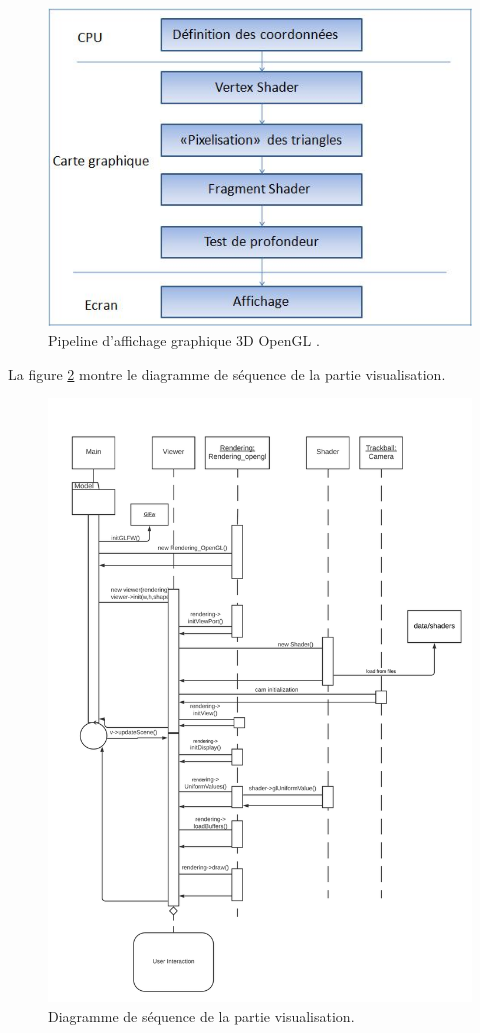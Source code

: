 \documentclass[a4paper]{article}
\begin{document}
\begin{figure}[!ht]
        \begin{center} \includegraphics[width=0.8\linewidth]{img/archi/shader_theory.jpg} \end{center}
        \caption{\label{shader_theory}Pipeline d'affichage graphique 3D OpenGL \protect\footnotemark .}
\end{figure}


La figure \ref{seqvisu} montre le diagramme de séquence de la partie visualisation.

\begin{figure}[!ht]
    \begin{center}
        \includegraphics[width=0.7\linewidth]{img/visu_seq.png} 
        \caption{Diagramme de séquence de la partie visualisation.}
        \label{seqvisu}
    \end{center}
\end{figure}
\end{document}
